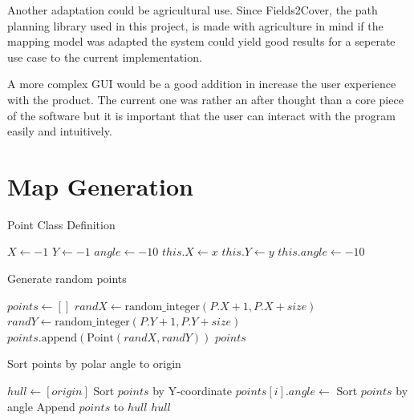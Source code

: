 \documentclass[final]{cmpreport_02}
\begin{document}
Another adaptation could be agricultural use. 
Since Fields2Cover, the path planning library used in this project, is made with agriculture in mind if the mapping model was adapted the system could yield good results for a seperate use case to the current implementation.

A more complex GUI would be a good addition in increase the user experience with the product. The current one was rather an after thought than a core piece of the software but it is important that the user can interact with the program easily and intuitively.



\clearpage



\appendix
\clearpage

\section{Map Generation}

\begin{algorithm}[h!]
	\caption{Point Class Definition}
	\label{mg:point class}
	\begin{algorithmic}[1]
		\State $X \gets -1$ 
		\State $Y \gets -1$ 
		\State $angle \gets -10$ 
		\State $this.X \gets x$
		\State $this.Y \gets y$
		\State $this.angle \gets -10$ 
		\EndProcedure
		\EndProcedure
	\end{algorithmic}
\end{algorithm}

\begin{algorithm}[h!]
	\caption{Generate random points}
	\label{mg:genPoints}
	\begin{algorithmic}[1]
		\State $points \gets []$
		\State $randX \gets \text{random\_integer}(P.X + 1, P.X + size)$
		\State $randY \gets \text{random\_integer}(P.Y + 1, P.Y + size)$
		\State $points.\text{append}(\text{Point}(randX, randY))$
		\EndFor
		\State \Return $points$
		\EndFunction
	\end{algorithmic}
\end{algorithm}

\begin{algorithm}[h!]
	\caption{Sort points by polar angle to origin}
	\label{mg:sortPoints}
	\begin{algorithmic}[1]
		\State $hull \gets [origin]$
		\State Sort $points$ by Y-coordinate
		\State $points[i].angle \gets$ 
		\EndFor
		\State Sort $points$ by angle
		\State Append $points$ to $hull$
		\State \Return $hull$
		\EndFunction
	\end{algorithmic}
\end{algorithm}
\end{document}
